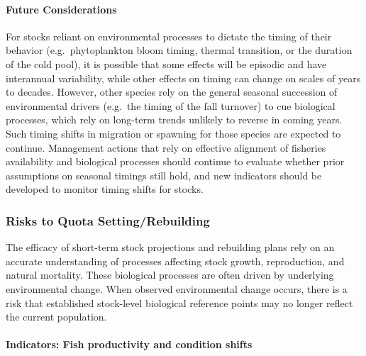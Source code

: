 \documentclass[
  10pt,
]{article}
\begin{document}
\hypertarget{future-considerations-1}{%
\paragraph{Future Considerations}\label{future-considerations-1}}

For stocks reliant on environmental processes to dictate the timing of their behavior (e.g.~phytoplankton bloom timing, thermal transition, or the duration of the cold pool), it is possible that some effects will be episodic and have interannual variability, while other effects on timing can change on scales of years to decades. However, other species rely on the general seasonal succession of environmental drivers (e.g.~the timing of the fall turnover) to cue biological processes, which rely on long-term trends unlikely to reverse in coming years. Such timing shifts in migration or spawning for those species are expected to continue. Management actions that rely on effective alignment of fisheries availability and biological processes should continue to evaluate whether prior assumptions on seasonal timings still hold, and new indicators should be developed to monitor timing shifts for stocks.

\hypertarget{risks-to-quota-settingrebuilding}{%
\subsubsection{Risks to Quota Setting/Rebuilding}\label{risks-to-quota-settingrebuilding}}

The efficacy of short-term stock projections and rebuilding plans rely on an accurate understanding of processes affecting stock growth, reproduction, and natural mortality. These biological processes are often driven by underlying environmental change. When observed environmental change occurs, there is a risk that established stock-level biological reference points may no longer reflect the current population.

\hypertarget{indicators-fish-productivity-and-condition-shifts}{%
\paragraph{Indicators: Fish productivity and condition shifts}\label{indicators-fish-productivity-and-condition-shifts}}
\end{document}

